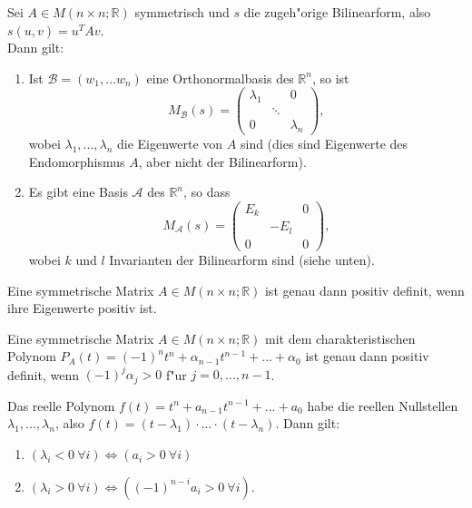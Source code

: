 \documentclass[11pt, a4paper]{article}
\begin{document}
\begin{theorem}  Sei $A \in M(n \times n; \mathbb{R})$ symmetrisch und $s$ die zugeh"orige Bilinearform, also $s(u, v) = u^T A v$.
\\Dann gilt:
\begin{enumerate}
\item Ist $\mathcal{B} = (w_1, ... w_n)$ eine Orthonormalbasis des $\mathbb{R}^n$, so ist
$$
M_\mathcal{B}(s) = \left(\begin{array}{ccc}\lambda_{1} & & 0 
\\ & \ddots & 
\\ 0 & & \lambda_{n}\end{array}\right), 
$$
wobei $\lambda_1, ..., \lambda_n$ die Eigenwerte von $A$ sind (dies sind Eigenwerte des Endomorphismus $A$, aber nicht der Bilinearform).
\item Es gibt eine Basis $\mathcal{A}$ des $\mathbb{R}^n$, so dass
$$
M_\mathcal{A}(s) =  \left(\begin{array}{ccc}E_k & & 0 
\\ & -E_l & 
\\ 0 & & 0\end{array}\right),
$$
wobei $k$ und $l$ Invarianten der Bilinearform sind (siehe unten).
\end{enumerate}
\end{theorem}

\begin{corollary}
Eine symmetrische Matrix $A \in M(n \times n; \mathbb{R})$ ist genau dann positiv definit, wenn ihre Eigenwerte positiv ist.
\end{corollary}

\begin{corollary}
Eine symmetrische Matrix $A \in M(n \times n; \mathbb{R})$ mit dem charakteristischen Polynom $P_A(t) = (-1)^n t^n + \alpha_{n-1}t^{n-1} + ... + \alpha_0$ ist genau dann positiv definit, wenn $(-1)^j \alpha_j > 0$ f"ur $j = 0, ..., n-1$.
\end{corollary}

\begin{lemma}
Das reelle Polynom $f(t) = t^n + a_{n-1}t^{n-1} + ... +a_0$ habe die reellen Nullstellen $\lambda_1, ..., \lambda_n$, also $f(t) = (t - \lambda_1) \cdot ... \cdot (t - \lambda_n)$. Dann gilt:
\begin{enumerate}
\item $(\lambda_i < 0 \ \forall i) \Leftrightarrow (a_i > 0 \ \forall i)$
\item $(\lambda_i > 0 \ \forall i) \Leftrightarrow ( (-1)^{n-i}a_i > 0 \ \forall i)$.
\end{enumerate}

\end{lemma}
\end{document}
